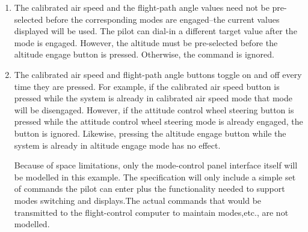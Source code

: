 \documentclass{article}
\begin{document}
{\begin{enumerate}
\item The calibrated air speed and the flight-path angle values need not be pre-selected before the
corresponding modes are engaged--the current values displayed will be used. The pilot can dial-in
a different target value after the mode is engaged. However, the altitude must be pre-selected
before the altitude engage button is pressed. Otherwise, the command is ignored.

\item The calibrated air speed and flight-path angle buttons toggle on and off every time they are
pressed. For example, if the calibrated air speed button is pressed while the system is already in
calibrated air speed mode that mode will be disengaged. However, if the attitude control wheel
steering button is pressed while the attitude control wheel steering mode is already engaged, the
button is ignored. Likewise, pressing the altitude engage button while the system is already in
altitude engage mode has no effect.

Because of space limitations, only the mode-control panel interface itself will be modelled in this
example. The specification will only include a simple set of commands the pilot can enter plus the 
functionality needed to support modes switching and displays.The actual commands that would
be transmitted to the flight-control computer to maintain modes,etc., are not modelled.

\end{enumerate}
}
\end{document}
